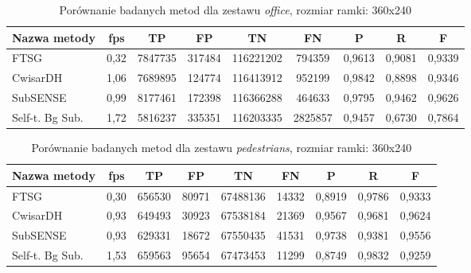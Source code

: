 \begin{table}[!h]
\small
\caption{Porównanie badanych metod dla zestawu \textit{office}, rozmiar ramki: 360x240}
\label{tab:resultsOffice}
\centering
\begin{tabular*}{\textwidth}{@{\extracolsep{\fill}} |l*{8}{|c}|}
  \hline 
  \textbf{Nazwa metody} & \textbf{fps} & \textbf{TP} & \textbf{FP} & \textbf{TN} & \textbf{FN} & \textbf{P} & \textbf{R} & \textbf{F}\\
  \hline
  FTSG & 0,32 & 7847735 & 317484 & 116221202 & 794359 & 0,9613 & 0,9081 & 0,9339\\ 
\hline
CwisarDH & 1,06 & 7689895 & 124774 & 116413912 & 952199 & 0,9842 & 0,8898 & 0,9346\\ 
\hline
SubSENSE & 0,99 & 8177461 & 172398 & 116366288 & 464633 & 0,9795 & 0,9462 & 0,9626\\ 
\hline
Self-t. Bg Sub. & 1,72 & 5816237 & 335351 & 116203335 & 2825857 & 0,9457 & 0,6730 & 0,7864\\ 
\hline
\end{tabular*}
\end{table}

\begin{table}[!h]
\small
\caption{Porównanie badanych metod dla zestawu \textit{pedestrians}, rozmiar ramki: 360x240}
\label{tab:resultsPedestrians}
\centering
\begin{tabular*}{\textwidth}{@{\extracolsep{\fill}} |l*{8}{|c}|}
  \hline 
  \textbf{Nazwa metody} & \textbf{fps} & \textbf{TP} & \textbf{FP} & \textbf{TN} & \textbf{FN} & \textbf{P} & \textbf{R} & \textbf{F}\\
  \hline
  FTSG & 0,30 & 656530 & 80971 & 67488136 & 14332 & 0,8919 & 0,9786 & 0,9333\\ 
\hline
CwisarDH & 0,93 & 649493 & 30923 & 67538184 & 21369 & 0,9567 & 0,9681 & 0,9624\\ 
\hline
SubSENSE & 0,93 & 629331 & 18672 & 67550435 & 41531 & 0,9738 & 0,9381 & 0,9556\\ 
\hline
Self-t. Bg Sub. & 1,53 & 659563 & 95654 & 67473453 & 11299 & 0,8749 & 0,9832 & 0,9259\\ 
\hline
\end{tabular*}
\end{table}

